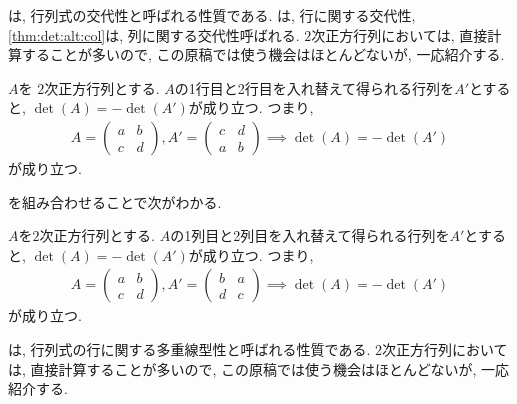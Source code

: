 は,
行列式の交代性と呼ばれる性質である.
は,
行に関する交代性,
\cref{thm:det:alt:col}は,
列に関する交代性呼ばれる.
$2$次正方行列においては,
直接計算することが多いので,
この原稿では使う機会はほとんどないが,
一応紹介する.
\begin{theorem}
  \label{thm:det:alt:row}
  $A$を
  $2$次正方行列とする.
  $A$の1行目と2行目を入れ替えて得られる行列を$A'$とすると,
  $\det(A)=-\det(A')$が成り立つ.
  つまり,
  \begin{align*}
    A=\begin{pmatrix}a&b\\c&d\end{pmatrix},
    A'=\begin{pmatrix}c&d\\a&b\end{pmatrix}
    \implies \det(A)=-\det(A')
  \end{align*}
  が成り立つ.
\end{theorem}
を組み合わせることで次がわかる.
\begin{theorem}
  \label{thm:det:alt:col}
  $A$を$2$次正方行列とする.
  $A$の1列目と2列目を入れ替えて得られる行列を$A'$とすると,
  $\det(A)=-\det(A')$が成り立つ.
  つまり,
  \begin{align*}
    A=\begin{pmatrix}a&b\\c&d\end{pmatrix},
    A'=\begin{pmatrix}b&a\\d&c\end{pmatrix}
    \implies
    \det(A)=-\det(A')
  \end{align*}
が成り立つ.
\end{theorem}
は,
行列式の行に関する多重線型性と呼ばれる性質である.
$2$次正方行列においては,
直接計算することが多いので,
この原稿では使う機会はほとんどないが,
一応紹介する.
